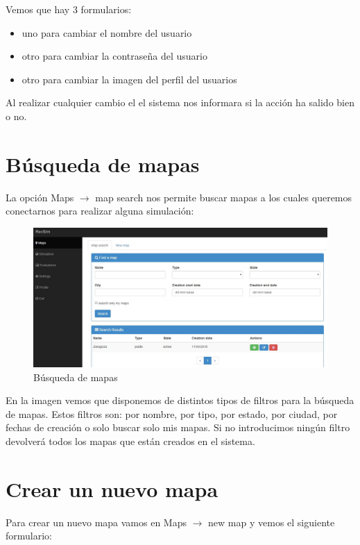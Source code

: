 Vemos que hay 3 formularios:

\begin{itemize}
	\item uno para cambiar el nombre del usuario
	\item otro para cambiar la contraseña del usuario
	\item otro para cambiar la imagen del perfil del usuarios
\end{itemize}

Al realizar cualquier cambio el el sistema nos informara si la acción ha salido bien o no.

\section{Búsqueda de mapas}\label{sec:BuscarMapas}

La opción Maps $\rightarrow$ map search nos permite buscar mapas a los cuales queremos conectarnos para realizar alguna simulación:

\begin{figure}[H]
	\centering\includegraphics[scale=0.35]{imagenes/capitulo7/busqueda-de-mapas.jpg}
	\caption{Búsqueda de mapas}
	\label{img:BuscarMapas}
\end{figure}

En la imagen vemos que disponemos de distintos tipos de filtros para la búsqueda de mapas. Estos filtros son: por nombre, por tipo, por estado, por ciudad, por fechas de creación o solo buscar solo mis mapas. Si no introducimos ningún filtro devolverá todos los mapas que están creados en el sistema.

\section{Crear un nuevo mapa}\label{sec:crearMapa}

Para crear un nuevo mapa vamos en Maps $\rightarrow$ new map y vemos el siguiente formulario:

